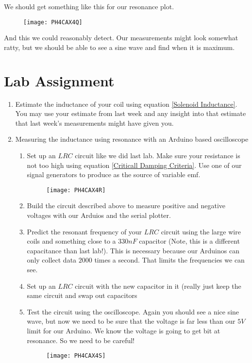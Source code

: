 We should get something like this for our resonance plot.

\begin{figure}[h!]
	\centering
	\texttt{[image: PH4CAX4Q]}
\end{figure}
And this we could reasonably detect. Our measurements might look somewhat ratty, but we should be able to see a sine wave and find when it is maximum.

\section{Lab Assignment}

\begin{enumerate}
	\item Estimate the inductance of your coil using equation \ref{Solenoid Inductance}. You may use your estimate from last week and any insight into that estimate that last week's measurements might have given you.

	\item Measuring the inductance using resonance with an Arduino based oscilloscope

	\begin{enumerate}
		\item Set up an $LRC$ circuit like we did last lab. Make sure your resistance is not too high using equation \ref{Criticall Damping Criteria}. Use one of our signal generators to produce as the source of variable emf. 
		\begin{figure}[h!]
			\centering
			\texttt{[image: PH4CAX4R]}
		\end{figure}

		\item Build the circuit described above to measure positive and negative voltages with our Arduios and the serial plotter.

		\item Predict the resonant frequency of your $LRC$ circuit using the large wire coils and something close to a $330\unit{nF}$ capacitor (Note, this is a different capacitance than last lab!). This is necessary because our Arduinos can only collect data $2000$ times a second. That limits the frequencies we can see.

		\item Set up an $LRC$ circuit with the new capacitor in it (really just keep the same circuit and swap out capacitors

		\item Test the circuit using the oscilloscope. Again you should see a nice sine wave, but now we need to be sure that the voltage is far less than our $5\unit{V}$ limit for our Arduino. We know the voltage is going to get bit at resonance. So we need to be careful! 
		\begin{figure}[h!]
			\centering
			\texttt{[image: PH4CAX4S]}
		\end{figure}


\end{enumerate}
\end{enumerate}
